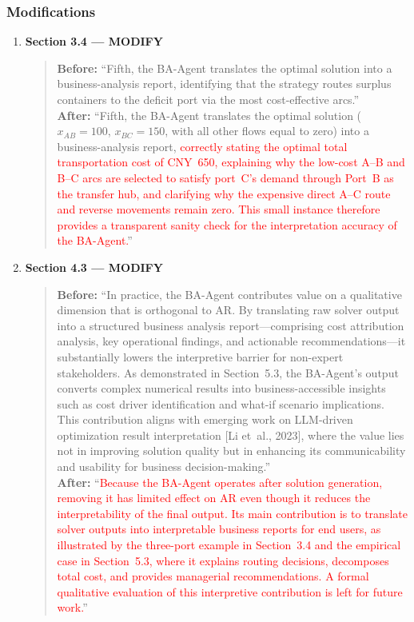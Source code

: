 \documentclass[11pt,a4paper]{article}
\begin{document}
\subsubsection{Modifications}
\begin{enumerate}
\item \textbf{Section 3.4 --- MODIFY}
\begin{quote}
\textbf{Before:} ``Fifth, the BA-Agent translates the optimal solution into a business-analysis report, identifying that the strategy routes surplus containers to the deficit port via the most cost-effective arcs.''\\[4pt]
\textbf{After:} ``Fifth, the BA-Agent translates the optimal solution ($x_{AB}{=}100$, $x_{BC}{=}150$, with all other flows equal to zero) into a business-analysis report, \textcolor{red}{correctly stating the optimal total transportation cost of CNY~650, explaining why the low-cost A--B and B--C arcs are selected to satisfy port~C's demand through Port~B as the transfer hub, and clarifying why the expensive direct A--C route and reverse movements remain zero. This small instance therefore provides a transparent sanity check for the interpretation accuracy of the BA-Agent.}''
\end{quote}

\item \textbf{Section 4.3 --- MODIFY}
\begin{quote}
\textbf{Before:} ``In practice, the BA-Agent contributes value on a qualitative dimension that is orthogonal to AR. By translating raw solver output into a structured business analysis report---comprising cost attribution analysis, key operational findings, and actionable recommendations---it substantially lowers the interpretive barrier for non-expert stakeholders. As demonstrated in Section~5.3, the BA-Agent's output converts complex numerical results into business-accessible insights such as cost driver identification and what-if scenario implications. This contribution aligns with emerging work on LLM-driven optimization result interpretation [Li et~al., 2023], where the value lies not in improving solution quality but in enhancing its communicability and usability for business decision-making.''\\[4pt]
\textbf{After:} ``\textcolor{red}{Because the BA-Agent operates after solution generation, removing it has limited effect on AR even though it reduces the interpretability of the final output. Its main contribution is to translate solver outputs into interpretable business reports for end users, as illustrated by the three-port example in Section~3.4 and the empirical case in Section~5.3, where it explains routing decisions, decomposes total cost, and provides managerial recommendations. A formal qualitative evaluation of this interpretive contribution is left for future work.}''
\end{quote}


\end{enumerate}
\end{document}
